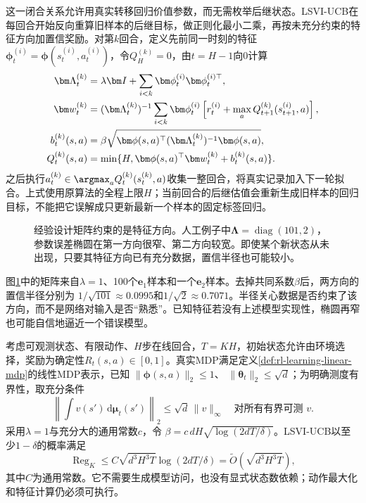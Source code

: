 这一闭合关系允许用真实转移回归价值参数，而无需枚举后继状态。LSVI-UCB在每回合开始反向重算旧样本的后继目标，做正则化最小二乘，再按未充分约束的特征方向加置信奖励。对第$k$回合，定义先前同一时刻的特征
$\bm\phi_t^{(i)}=\bm\phi(s_t^{(i)},a_t^{(i)})$，令$Q_H^{(k)}=0$，由$t=H-1$向0计算
\begin{align}
 \bm\Lambda_t^{(k)}
   &=\lambda\bm I+\sum_{i<k}
                         \bm\phi_t^{(i)}\bm\phi_t^{(i)\top},\notag\\
 \bm w_t^{(k)}
   &=(\bm\Lambda_t^{(k)})^{-1}
       \sum_{i<k}\bm\phi_t^{(i)}
       \left[r_t^{(i)}
             +\max_aQ_{t+1}^{(k)}(s_{t+1}^{(i)},a)\right],\notag\\
 b_t^{(k)}(s,a)
   &=\beta\sqrt{\bm\phi(s,a)^\top
                     (\bm\Lambda_t^{(k)})^{-1}\bm\phi(s,a)},\notag\\
 Q_t^{(k)}(s,a)
   &=\min\{H,\bm\phi(s,a)^\top\bm w_t^{(k)}
                                       +b_t^{(k)}(s,a)\}.
 \label{eq:rl-learning-lsvi}
\end{align}
之后执行$a_t^{(k)}\in\argmax_aQ_t^{(k)}(s_t^{(k)},a)$收集一整回合，将真实记录加入下一轮拟合。上式使用原算法的全程上限$H$；当前回合的后继估值会重新生成旧样本的回归目标，不能把它误解成只更新最新一个样本的固定标签回归。

\begin{figure}[t]
  \centering
  
  \caption{经验设计矩阵约束的是特征方向。人工例子中$\bm\Lambda=\operatorname{diag}(101,2)$，参数误差椭圆在第一方向很窄、第二方向较宽。即使某个新状态从未出现，只要其特征方向已有充分数据，置信半径也可能较小。}
  \label{fig:rl-learning-linear-design}
\end{figure}

图\ref{fig:rl-learning-linear-design}中的矩阵来自$\lambda=1$、100个$\bm e_1$样本和一个$\bm e_2$样本。去掉共同系数$\beta$后，两方向的置信半径分别为
$1/\sqrt{101}\approx0.0995$和$1/\sqrt2\approx0.7071$。半径关心数据是否约束了该方向，而不是网络对输入是否“熟悉”。已知特征若没有上述模型实现性，椭圆再窄也可能自信地逼近一个错误模型。

\begin{theorem}
  \label{thm:rl-learning-lsvi}
  考虑可观测状态、有限动作、$H$步在线回合，$T=KH$，初始状态允许由环境选择，奖励为确定性$R_t(s,a)\in[0,1]$。真实MDP满足定义\ref{def:rl-learning-linear-mdp}的线性MDP表示，已知
  $\|\bm\phi(s,a)\|_2\leq1$、
  $\|\bm\theta_t\|_2\leq\sqrt d$；为明确测度有界性，取充分条件
  \[
    \left\|\int v(s')\,\mathrm d\bm\mu_t(s')\right\|_2
                          \leq\sqrt d\,\|v\|_\infty
        \quad\text{对所有有界可测 }v.
  \]
  采用$\lambda=1$与充分大的通用常数$c$，令
  $\beta=c\,dH\sqrt{\log(2dT/\delta)}$。LSVI-UCB以至少$1-\delta$的概率满足
  \[
    \operatorname{Reg}_K
       \leq C\sqrt{d^3H^3T}\log(2dT/\delta)
       =\widetilde O(\sqrt{d^3H^3T}),
  \]
  其中$C$为通用常数。它不需要生成模型访问，也没有显式状态数依赖；动作最大化和特征计算仍必须可执行。
\end{theorem}

